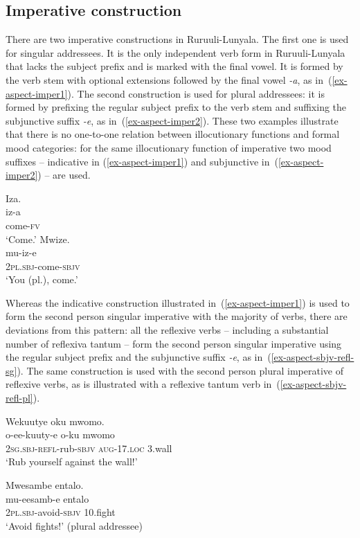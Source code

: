 \subsection{Imperative construction}\label{sec-imperative}

There are two imperative constructions in Ru\-ruu\-li\hyp{}Lu\-nya\-la. 
The first one is used for singular addressees. 
It is the only independent verb form in Ru\-ruu\-li\hyp{}Lu\-nya\-la that lacks the subject prefix and is marked with the final vowel.
It is formed by the verb stem with optional extensions followed by the final vowel \emph{-a}, as in~(\ref{ex-aspect-imper1}). 
The second construction is used for plural addressees: 
it is formed by prefixing the regular subject prefix to the verb stem and suffixing the subjunctive suffix \emph{-e}, as in~(\ref{ex-aspect-imper2}).
These two examples illustrate that there is no one-to-one relation between illocutionary functions and formal mood categories: 
for the same illocutionary function of imperative two mood  suffixes – indicative in (\ref{ex-aspect-imper1}) and subjunctive in~(\ref{ex-aspect-imper2}) – are used. 

\ea \label{ex-aspect-imper}
\begin{xlist}
\ex	\label{ex-aspect-imper1}
	\glll Iza.\\
	iz-a\\
		come-\textsc{fv}\\
	\glt ‘Come.’ 
\ex 	\label{ex-aspect-imper2}
	\glll Mwize.\\
	  mu-iz-e\\
		2\textsc{pl.sbj}-come-\textsc{sbjv}\\
	\glt  ‘You (pl.), come.'
\end{xlist}
\z

Whereas the indicative construction illustrated in~(\ref{ex-aspect-imper1}) is used to form the second person singular imperative with the majority of verbs, there are deviations from this pattern: all the reflexive verbs – including a substantial number of reflexiva tantum – form the second person singular imperative using the regular subject prefix and the subjunctive suffix \emph{-e}, as in~(\ref{ex-aspect-sbjv-refl-sg}). 
The same construction is used with the second person plural imperative of reflexive verbs, as is illustrated with a reflexive tantum verb in~(\ref{ex-aspect-sbjv-refl-pl}).

\ea \label{ex-aspect-sbjv-refl}
\begin{xlist}
\ex	\label{ex-aspect-sbjv-refl-sg}
	\glll Wekuutye 		oku			mwomo.\\
	  o-ee-kuuty-e 		o-ku			mwomo\\
		2\textsc{sg.sbj}-\textsc{refl}-rub-\textsc{sbjv} \textsc{aug}-17.\textsc{loc} 3.wall\\
\glt  ‘Rub yourself against the wall!’

\ex 	\label{ex-aspect-sbjv-refl-pl}
	\glll Mwesambe	entalo.\\
	  mu-eesamb-e            		entalo\\
		2\textsc{pl.sbj}-avoid-\textsc{sbjv} 10.fight\\
\glt ‘Avoid fights!’ (plural addressee) 

\end{xlist}
\z

